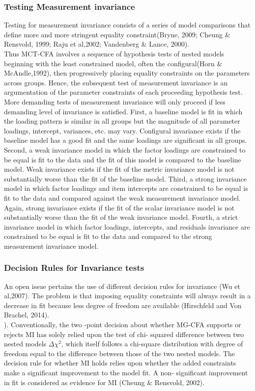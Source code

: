 \documentclass[12pt]{article}
\begin{document}
\subsubsection{Testing Measurement invariance}
\noindent Testing for measurement invariance consists of a series of model comparisons that define more and more stringent equality constraint(Bryne, 2009; Cheung \& Rensvold, 1999; Raju et al,2002; Vandenberg \& Lance, 2000).\\
Thus MCT-CFA involves a sequence of hypothesis tests of nested models beginning with the least constrained model, often the configural(Horn \& McAndle,1992), then progressively placing equality constraints on the parameters across groups. Hence, the subsequent test of measurement invariance is an argumentation of the parameter constraints of each proceeding hypothesis test. More demanding tests of measurement invariance will only proceed if less demanding level of invariance is satisfied. First, a baseline model is fit in which the loading pattern is similar in all groups but the magnitude of all parameter loadings, intercept, variances, etc. may vary. Configural invariance exists if the baseline model has a good fit and the same loadings are significant in all groups. Second, a weak invariance model in which the factor loadings are constrained to be equal is fit to the data and the fit of this model is compared to the baseline model. Weak invariance exists if the fit of the metric invariance model is not substantially worse than the fit of the baseline model. Third, a strong invariance model in which factor loadings and item intercepts are constrained to be equal is fit to the data and compared against the weak measurement invariance model. Again, strong invariance exists if the fit of the scalar invariance model is not substantially worse than the fit of the weak invariance model. Fourth, a strict invariance model in which factor loadings, intercepts, and residuals invariance are constrained to be equal is fit to the data and compared to the strong measurement invariance model. 

\subsubsection{Decision Rules for Invariance tests}

An open issue pertains the use of different decision rules for invariance (Wu et al,2007). The problem is that imposing equality constraints will always result in a decrease in fit because less degree of freedom are available (Hirschfeld and Von Brachel, 2014). \\
). Conventionally, the two -point decision about whether MG-CFA supports or rejects MI has solely relied upon the test of chi- squared difference between two nested models $\Delta{\chi}^2$, which itself follows a chi-square distribution with degree of freedom equal to the difference between those of the two nested models. The decision rule for whether MI holds relies upon whether the added constraints make a significant improvement to the model fit. A non- significant improvement in fit is considered as evidence for MI (Cheung \& Rensvold, 2002). \\
\end{document}
